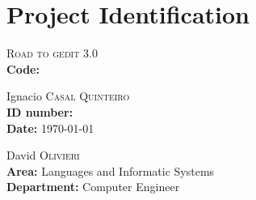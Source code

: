 
\chapter{Project Identification}

 \textsc{Road to gedit 3.0}\\
{\bf Code:} %

 Ignacio \textsc{Casal Quinteiro}\\
{\bf ID number:} \\ %
{\bf Date:} \today

 David \textsc{Olivieri}\\
{\bf Area:} Languages and Informatic Systems\\
{\bf Department:} Computer Engineer
